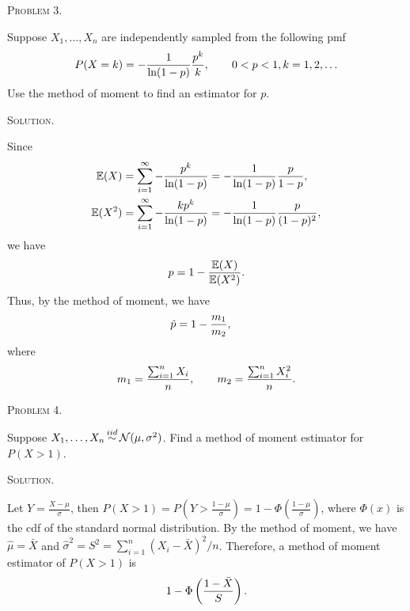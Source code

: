 \documentclass{article}
\begin{document}
\begin{CJK}{UTF8}{gbsn}
    \begin{shaded}
        \noindent\textsc{Problem 3.}\par
        Suppose $X_1,\ldots, X_n$ are independently sampled from the following pmf
        \begin{align}
            P(X=k)= - \frac{1}{\textnormal{ln}(1-p)} \frac{p^k}{k}, \qquad 0 < p < 1, k=1, 2,\ldots
        \end{align}
        Use the method of moment to find an estimator for $p$.
    \end{shaded}
    \noindent\textsc{Solution.}\par
    Since
    \begin{align}
        {\mathbb E}(X)   & = \sum_{i=1}^{\infty} -\frac{p^k}{\textnormal{ln}(1-p)} = -\frac{1}{\textnormal{ln}(1-p)} \frac{p}{1-p} , \notag    \\
        {\mathbb E}(X^2) & = \sum_{i=1}^{\infty} -\frac{kp^k}{\textnormal{ln}(1-p)} = -\frac{1}{\textnormal{ln}(1-p)} \frac{p}{(1-p)^2},\notag
    \end{align}
    we have
    \begin{align}
        p = 1 - \frac{{\mathbb E}(X)}{{\mathbb E}(X^2)}.\notag
    \end{align}
    Thus, by the method of moment, we have
    \begin{align}
        \hat{p} & = 1 - \frac{m_1}{m_2},\notag
    \end{align}
    where
    \begin{align}
        m_1 = \frac{\sum_{i=1}^n X_i}{n}, \qquad m_2 = \frac{\sum_{i=1}^n X_i^2}{n}.\notag
    \end{align}


    \begin{shaded}
        \noindent\textsc{Problem 4.}\par
        Suppose $X_1,\ldots, X_n \mathop{\sim}\limits^{iid} {\mathcal N}(\mu, \sigma^2)$. Find a method of moment
        estimator for $P(X>1)$.
    \end{shaded}
    \noindent\textsc{Solution.}\par
    Let $Y=\frac{X-\mu}{\sigma}$, then $P(X>1) = P(Y>\frac{1-\mu}{\sigma})= 1-\Phi\left (\frac{1-\mu}{\sigma}\right )$, where $\Phi(x)$ is the cdf of the standard normal distribution.
    By the method of moment, we have $\hat{\mu} = \bar{X}$ and $\hat{\sigma}^2 = S^2 = \sum_{i=1}^n (X_i - \bar{X})^2/n$.
    Therefore, a method of moment estimator of $P(X>1)$ is
    \begin{align}
        1 - \Phi\left (\frac{1-\bar{X}}{S}\right ).\notag
    \end{align}
\end{CJK}
\end{document}
